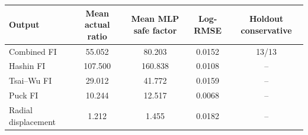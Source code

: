 \begin{tabular}{lcccc}
\toprule
Output & Mean actual ratio & Mean MLP safe factor & Log-RMSE & Holdout conservative \\
\midrule
Combined FI & 55.052 & 80.203 & 0.0152 & 13/13 \\
Hashin FI & 107.500 & 160.838 & 0.0108 & -- \\
Tsai--Wu FI & 29.012 & 41.772 & 0.0159 & -- \\
Puck FI & 10.244 & 12.517 & 0.0068 & -- \\
Radial displacement & 1.212 & 1.455 & 0.0182 & -- \\
\bottomrule
\end{tabular}
